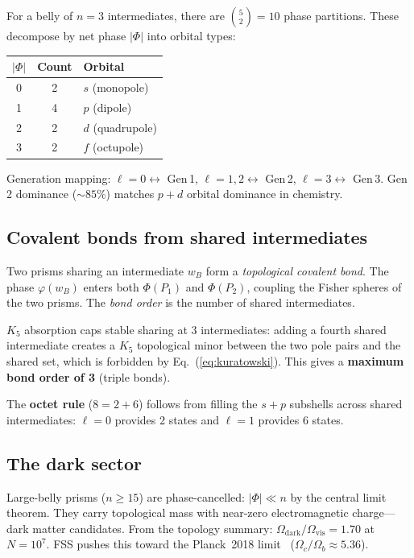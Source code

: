 \documentclass[aps,prd,twocolumn,superscriptaddress,nofootinbib,amsmath,amssymb,longbibliography]{revtex4-2}
\begin{document}
For a belly of $n = 3$ intermediates, there are
$\binom{5}{2} = 10$ phase partitions.  These decompose by net phase
$|\Phi|$ into orbital types:
\begin{center}
\begin{tabular}{@{}ccl@{}}
$|\Phi|$ & Count & Orbital \\
\midrule
0 & 2 & $s$ (monopole) \\
1 & 4 & $p$ (dipole) \\
2 & 2 & $d$ (quadrupole) \\
3 & 2 & $f$ (octupole)
\end{tabular}
\end{center}
Generation mapping: $\ell = 0 \leftrightarrow$ Gen\,1,
$\ell = 1, 2 \leftrightarrow$ Gen\,2,
$\ell = 3 \leftrightarrow$ Gen\,3.
Gen\,2 dominance (${\sim}85\%$) matches $p + d$ orbital dominance in
chemistry.

\subsection{Covalent bonds from shared intermediates}

Two prisms sharing an intermediate $w_B$ form a \emph{topological
covalent bond}.
The phase $\varphi(w_B)$ enters both $\Phi(P_1)$ and $\Phi(P_2)$,
coupling the Fisher spheres of the two prisms.
The \emph{bond order} is the number of shared intermediates.

$K_5$ absorption caps stable sharing at 3 intermediates: adding a
fourth shared intermediate creates a $K_5$ topological minor between
the two pole pairs and the shared set, which is
forbidden by Eq.~(\ref{eq:kuratowski}).
This gives a \textbf{maximum bond order of 3} (triple bonds).

The \textbf{octet rule} ($8 = 2 + 6$) follows from filling the
$s + p$ subshells across shared intermediates:
$\ell = 0$ provides 2 states and $\ell = 1$ provides 6 states.

\subsection{The dark sector}

Large-belly prisms ($n \geq 15$) are phase-cancelled:
$|\Phi| \ll n$ by the central limit theorem.
They carry topological mass with near-zero electromagnetic charge---dark
matter candidates.
From the topology summary:
$\Omega_{\mathrm{dark}}/\Omega_{\mathrm{vis}} = 1.70$ at $N = 10^7$.
FSS pushes this toward the Planck~2018
limit~\cite{planck2018} ($\Omega_c/\Omega_b \approx 5.36$).
\end{document}
